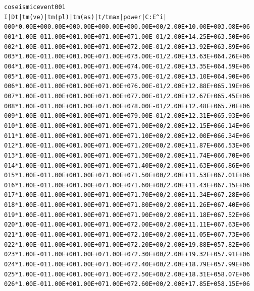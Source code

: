 \documentclass[10pt]{article}
\begin{document}
\begin{alltt}
coseismic event 001
 I  |   Dt   | tm(ve) | tm(pl) | tm(as) |     t/tmax     | power  |  C:E^i |
000* 0.00E+00 0.00E+00 0.00E+00 0.00E+00 0.00E+00/2.00E+1 0.00E+00 3.08E+06
001* {\color{NavyBlue}1.00E-01 1.00E+00} 1.00E+07 1.00E+07 1.00E-01/2.00E+1 {\color{NavyBlue}4.25E+06 3.50E+06}
002* 1.00E-01 1.00E+00 1.00E+07 1.00E+07 2.00E-01/2.00E+1 {\color{NavyBlue}3.92E+06 3.89E+06}
003* 1.00E-01 1.00E+00 1.00E+07 1.00E+07 3.00E-01/2.00E+1 {\color{NavyBlue}3.63E+06 4.26E+06}
004* 1.00E-01 1.00E+00 1.00E+07 1.00E+07 4.00E-01/2.00E+1 {\color{NavyBlue}3.35E+06 4.59E+06}
005* 1.00E-01 1.00E+00 1.00E+07 1.00E+07 5.00E-01/2.00E+1 {\color{NavyBlue}3.10E+06 4.90E+06}
006* 1.00E-01 1.00E+00 1.00E+07 1.00E+07 6.00E-01/2.00E+1 {\color{NavyBlue}2.88E+06 5.19E+06}
007* 1.00E-01 1.00E+00 1.00E+07 1.00E+07 7.00E-01/2.00E+1 {\color{NavyBlue}2.67E+06 5.45E+06}
008* 1.00E-01 1.00E+00 1.00E+07 1.00E+07 8.00E-01/2.00E+1 {\color{NavyBlue}2.48E+06 5.70E+06}
009* 1.00E-01 1.00E+00 1.00E+07 1.00E+07 9.00E-01/2.00E+1 {\color{NavyBlue}2.31E+06 5.93E+06}
010* 1.00E-01 1.00E+00 1.00E+07 1.00E+07 1.00E+00/2.00E+1 {\color{NavyBlue}2.15E+06 6.14E+06}
011* 1.00E-01 1.00E+00 1.00E+07 1.00E+07 1.10E+00/2.00E+1 {\color{NavyBlue}2.00E+06 6.34E+06}
012* 1.00E-01 1.00E+00 1.00E+07 1.00E+07 1.20E+00/2.00E+1 {\color{NavyBlue}1.87E+06 6.53E+06}
013* 1.00E-01 1.00E+00 1.00E+07 1.00E+07 1.30E+00/2.00E+1 {\color{NavyBlue}1.74E+06 6.70E+06}
014* 1.00E-01 1.00E+00 1.00E+07 1.00E+07 1.40E+00/2.00E+1 {\color{NavyBlue}1.63E+06 6.86E+06}
015* 1.00E-01 1.00E+00 1.00E+07 1.00E+07 1.50E+00/2.00E+1 {\color{NavyBlue}1.53E+06 7.01E+06}
016* 1.00E-01 1.00E+00 1.00E+07 1.00E+07 1.60E+00/2.00E+1 {\color{NavyBlue}1.43E+06 7.15E+06}
017* 1.00E-01 1.00E+00 1.00E+07 1.00E+07 1.70E+00/2.00E+1 {\color{NavyBlue}1.34E+06 7.28E+06}
018* 1.00E-01 1.00E+00 1.00E+07 1.00E+07 1.80E+00/2.00E+1 {\color{NavyBlue}1.26E+06 7.40E+06}
019* 1.00E-01 1.00E+00 1.00E+07 1.00E+07 1.90E+00/2.00E+1 {\color{NavyBlue}1.18E+06 7.52E+06}
020* 1.00E-01 1.00E+00 1.00E+07 1.00E+07 2.00E+00/2.00E+1 {\color{NavyBlue}1.11E+06 7.63E+06}
021* 1.00E-01 1.00E+00 1.00E+07 1.00E+07 2.10E+00/2.00E+1 {\color{NavyBlue}1.05E+06 7.73E+06}
022* 1.00E-01 1.00E+00 1.00E+07 1.00E+07 2.20E+00/2.00E+1 {\color{NavyBlue}9.88E+05 7.82E+06}
023* 1.00E-01 1.00E+00 1.00E+07 1.00E+07 2.30E+00/2.00E+1 {\color{NavyBlue}9.32E+05 7.91E+06}
024* 1.00E-01 1.00E+00 1.00E+07 1.00E+07 2.40E+00/2.00E+1 {\color{NavyBlue}8.79E+05 7.99E+06}
025* 1.00E-01 1.00E+00 1.00E+07 1.00E+07 2.50E+00/2.00E+1 {\color{NavyBlue}8.31E+05 8.07E+06}
026* 1.00E-01 1.00E+00 1.00E+07 1.00E+07 2.60E+00/2.00E+1 {\color{NavyBlue}7.85E+05 8.15E+06}

\end{alltt}
\end{document}
